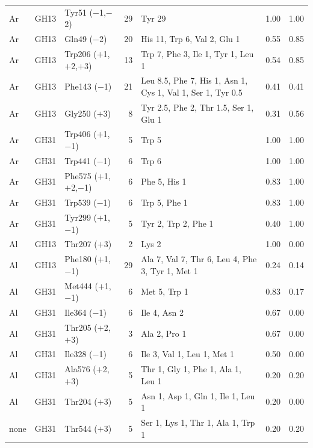 \begin{table}[h]
\begin{tabular}{lllrp{4.6cm}rr}
\midrule
Ar & GH13 & Tyr51 ($-$1,$-$2) & 29 & Tyr 29 & 1.00 & 1.00\\
Ar & GH13 & Gln49 ($-$2) & 20 & His 11, Trp 6, Val 2, Glu 1 & 0.55 & 0.85\\
Ar & GH13 & Trp206 ($+$1,$+$2,$+$3) & 13 & Trp 7, Phe 3, Ile 1, Tyr 1, Leu 1 & 0.54 & 0.85\\
Ar & GH13 & Phe143 ($-$1) & 21 & Leu 8.5, Phe 7, His 1, Asn 1, Cys 1, Val 1, Ser 1, Tyr 0.5 & 0.41 & 0.41\\
Ar & GH13 & Gly250 ($+$3) & 8 & Tyr 2.5, Phe 2, Thr 1.5, Ser 1, Glu 1 & 0.31 & 0.56\\
Ar & GH31 & Trp406 ($+$1,$-$1) & 5 & Trp 5 & 1.00 & 1.00\\
Ar & GH31 & Trp441 ($-$1) & 6 & Trp 6 & 1.00 & 1.00\\
Ar & GH31 & Phe575 ($+$1,$+$2,$-$1) & 6 & Phe 5, His 1 & 0.83 & 1.00\\
Ar & GH31 & Trp539 ($-$1) & 6 & Trp 5, Phe 1 & 0.83 & 1.00\\
Ar & GH31 & Tyr299 ($+$1,$-$1) & 5 & Tyr 2, Trp 2, Phe 1 & 0.40 & 1.00\\
\midrule
Al & GH13 & Thr207 ($+$3) & 2 & Lys 2 & 1.00 & 0.00\\
Al & GH13 & Phe180 ($+$1,$-$1) & 29 & Ala 7, Val 7, Thr 6, Leu 4, Phe 3, Tyr 1, Met 1 & 0.24 & 0.14\\
Al & GH31 & Met444 ($+$1,$-$1) & 6 & Met 5, Trp 1 & 0.83 & 0.17\\
Al & GH31 & Ile364 ($-$1) & 6 & Ile 4, Asn 2 & 0.67 & 0.00\\
Al & GH31 & Thr205 ($+$2,$+$3) & 3 & Ala 2, Pro 1 & 0.67 & 0.00\\
Al & GH31 & Ile328 ($-$1) & 6 & Ile 3, Val 1, Leu 1, Met 1 & 0.50 & 0.00\\
Al & GH31 & Ala576 ($+$2,$+$3) & 5 & Thr 1, Gly 1, Phe 1, Ala 1, Leu 1 & 0.20 & 0.20\\
Al & GH31 & Thr204 ($+$3) & 5 & Asn 1, Asp 1, Gln 1, Ile 1, Leu 1 & 0.20 & 0.00\\
\midrule
none & GH31 & Thr544 ($+$3) & 5 & Ser 1, Lys 1, Thr 1, Ala 1, Trp 1 & 0.20 & 0.20\\
\bottomrule
\end{tabular}
\end{table}
